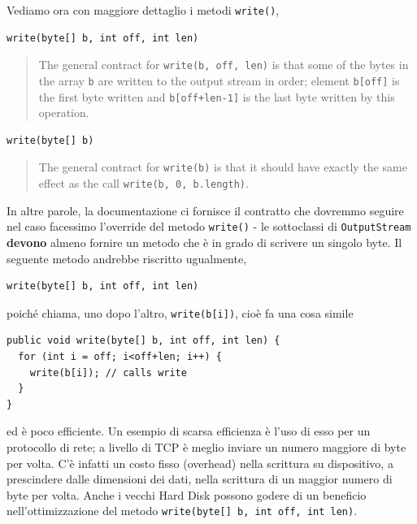 \documentclass[\fontsizeclass,twocolumn]{\classname}
\theoremstyle{definition}
\theoremstyle{definition}
\begin{document}
Vediamo ora con maggiore dettaglio i metodi \texttt{write()},

\begin{lstlisting}
write(byte[] b, int off, int len)
\end{lstlisting}

\begin{quote}
    \footnotesize{The general contract for \texttt{write(b, off, len)} is that some of
        the bytes in the array \texttt{b} are written to the output stream in order; element
        \texttt{b[off]} is the first byte written and \texttt{b[off+len-1]} is the last byte written by
this operation.}
\end{quote}

\begin{lstlisting}
write(byte[] b)
\end{lstlisting}

\begin{quote}
    \footnotesize{The general contract for \texttt{write(b)} is that it should have
        exactly the same effect as the call \texttt{write(b, 0, b.length)}.
}
\end{quote}

In altre parole, la documentazione ci fornisce il contratto che dovremmo
seguire nel caso facessimo l'override del metodo \texttt{write()} \-- le
sottoclassi di \texttt{Output\-Stream} \textbf{devono} almeno fornire un metodo
che è in grado di scrivere un singolo byte. Il seguente metodo andrebbe riscritto ugualmente,

\begin{lstlisting}
write(byte[] b, int off, int len)
\end{lstlisting}

poiché chiama, uno dopo l'altro, \texttt{write(b[i])}, cioè fa una cosa simile

\begin{lstlisting}
public void write(byte[] b, int off, int len) {
  for (int i = off; i<off+len; i++) {
    write(b[i]); // calls write
  }
}
\end{lstlisting}

ed è poco efficiente. Un esempio di scarsa efficienza è l'uso di esso per un protocollo di rete;
a livello di TCP è meglio inviare un numero maggiore di byte per volta. C'è
infatti un costo fisso (overhead) nella scrittura su dispositivo, a prescindere
dalle dimensioni dei dati, nella scrittura di un maggior numero di byte per
volta. Anche i vecchi Hard Disk possono godere di un beneficio
nell'ottimizzazione del metodo \texttt{write(byte[] b, int off, int len)}.
\end{document}
